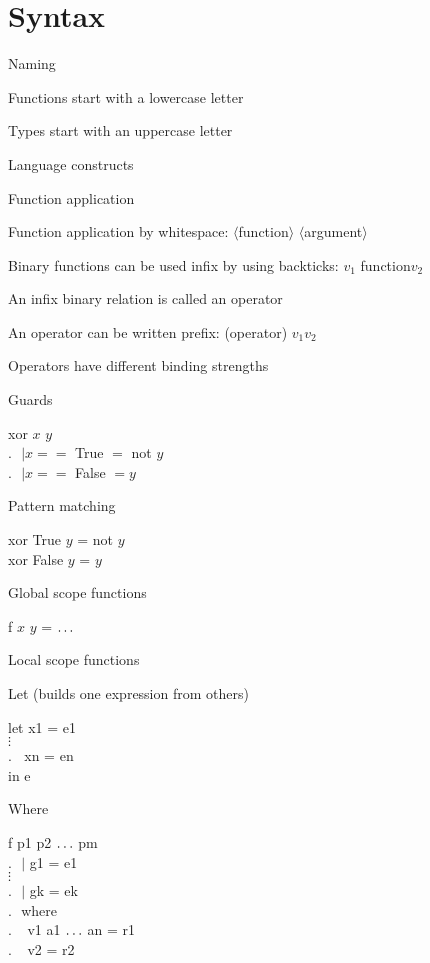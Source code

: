 \section{Syntax}
\enumstart
	\item Naming
	\enumstart
		\item Functions start with a lowercase letter
		\item Types start with an uppercase letter
	\enumend
	\item Language constructs
	\enumstart
		\item Function application
		\enumstart
			\item Function application by whitespace: $\langle$function$\rangle$ $\langle$argument$\rangle$
			\item Binary functions can be used infix by using backticks: $v_1$ \backtick function\backtick $v_2$
			\item An infix binary relation is called an operator
			\item An operator can be written prefix: (operator) $v_1 v_2$
			\item Operators have different binding strengths
		\enumend
		\item Guards
		\enumstart
			\item xor $x$ $y$\\ $.\ \ \ | x ==$ True $=$ not $y$\\ $.\ \ \ | x ==$ False $= y$
		\enumend
		\item Pattern matching
		\enumstart
			\item xor True $y$ = not $y$\\xor False $y$ = $y$
		\enumend
		\item Global scope functions
		\enumstart
			\item f $x$ $y$ = $\mathellipsis$
		\enumend
		\item Local scope functions
		\enumstart
			\item Let (builds one expression from others)
			\enumstart
				\item let x1 = e1\\$\vdots$\\.$\ \ \ \ $xn = en\\in e
			\enumend
			\item Where
			\enumstart
				\item f p1 p2 $\mathellipsis$ pm\\.$\ \ \ |$ g1 = e1\\$\vdots$\\.$\ \ \ |$ gk = ek\\.$\ \ \ $where\\.$\ \ \ \ \ $v1 a1 $\mathellipsis$ an = r1\\.$\ \ \ \ \ $v2 = r2
			\enumend
		\enumend
	\enumend
\enumend
